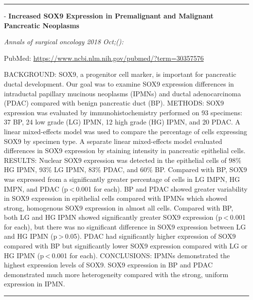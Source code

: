 \documentclass[]{article}
\begin{document}
{}

{}

\begin{center}\rule{0.5\linewidth}{\linethickness}\end{center}

 - \textbf{Increased SOX9 Expression in Premalignant and Malignant
Pancreatic Neoplasms}

\emph{Annals of surgical oncology 2018 Oct;():}

PubMed: \url{https://www.ncbi.nlm.nih.gov/pubmed/?term=30357576}

BACKGROUND: SOX9, a progenitor cell marker, is important for pancreatic
ductal development. Our goal was to examine SOX9 expression differences
in intraductal papillary mucinous neoplasms (IPMNs) and ductal
adenocarcinoma (PDAC) compared with benign pancreatic duct (BP).
METHODS: SOX9 expression was evaluated by immunohistochemistry performed
on 93 specimens: 37 BP, 24 low grade (LG) IPMN, 12 high grade (HG) IPMN,
and 20 PDAC. A linear mixed-effects model was used to compare the
percentage of cells expressing SOX9 by specimen type. A separate linear
mixed-effects model evaluated differences in SOX9 expression by staining
intensity in pancreatic epithelial cells. RESULTS: Nuclear SOX9
expression was detected in the epithelial cells of 98\% HG IPMN, 93\% LG
IPMN, 83\% PDAC, and 60\% BP. Compared with BP, SOX9 was expressed from
a significantly greater percentage of cells in LG IMPN, HG IMPN, and
PDAC (p \textless{} 0.001 for each). BP and PDAC showed greater
variability in SOX9 expression in epithelial cells compared with IPMNs
which showed strong, homogenous SOX9 expression in almost all cells.
Compared with BP, both LG and HG IPMN showed significantly greater SOX9
expression (p \textless{} 0.001 for each), but there was no significant
difference in SOX9 expression between LG and HG IPMN
(p \textgreater{} 0.05). PDAC had significantly higher expression of
SOX9 compared with BP but significantly lower SOX9 expression compared
with LG or HG IPMN (p \textless{} 0.001 for each). CONCLUSIONS: IPMNs
demonstrated the highest expression levels of SOX9. SOX9 expression in
BP and PDAC demonstrated much more heterogeneity compared with the
strong, uniform expression in IPMN.

{}

{}

\begin{center}\rule{0.5\linewidth}{\linethickness}\end{center}
\end{document}
